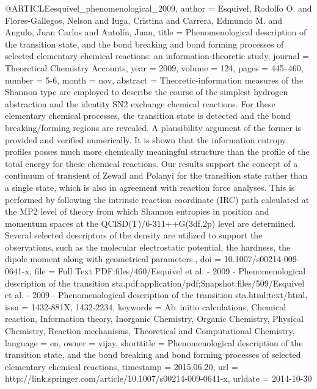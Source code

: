 @ARTICLE{esquivel_phenomenological_2009,
  author = {Esquivel, Rodolfo O. and Flores-Gallegos, Nelson and Iuga, Cristina
	and Carrera, Edmundo M. and Angulo, Juan Carlos and Antolín, Juan},
  title = {Phenomenological description of the transition state, and the bond
	breaking and bond forming processes of selected elementary chemical
	reactions: an information-theoretic study},
  journal = {Theoretical Chemistry Accounts},
  year = {2009},
  volume = {124},
  pages = {445--460},
  number = {5-6},
  month = nov,
  abstract = {Theoretic-information measures of the Shannon type are employed to
	describe the course of the simplest hydrogen abstraction and the
	identity SN2 exchange chemical reactions. For these elementary chemical
	processes, the transition state is detected and the bond breaking/forming
	regions are revealed. A plausibility argument of the former is provided
	and verified numerically. It is shown that the information entropy
	profiles posses much more chemically meaningful structure than the
	profile of the total energy for these chemical reactions. Our results
	support the concept of a continuum of transient of Zewail and Polanyi
	for the transition state rather than a single state, which is also
	in agreement with reaction force analyses. This is performed by following
	the intrinsic reaction coordinate (IRC) path calculated at the MP2
	level of theory from which Shannon entropies in position and momentum
	spaces at the QCISD(T)/6-311++G(3df,2p) level are determined. Several
	selected descriptors of the density are utilized to support the observations,
	such as the molecular electrostatic potential, the hardness, the
	dipole moment along with geometrical parameters.},
  doi = {10.1007/s00214-009-0641-x},
  file = {Full Text PDF:files/460/Esquivel et al. - 2009 - Phenomenological description of the transition sta.pdf:application/pdf;Snapshot:files/509/Esquivel et al. - 2009 - Phenomenological description of the transition sta.html:text/html},
  issn = {1432-881X, 1432-2234},
  keywords = {Ab initio calculations, Chemical reaction, Information theory, Inorganic
	Chemistry, Organic Chemistry, Physical Chemistry, Reaction mechanisms,
	Theoretical and Computational Chemistry},
  language = {en},
  owner = {vijay},
  shorttitle = {Phenomenological description of the transition state, and the bond
	breaking and bond forming processes of selected elementary chemical
	reactions},
  timestamp = {2015.06.20},
  url = {http://link.springer.com/article/10.1007/s00214-009-0641-x},
  urldate = {2014-10-30}
}

